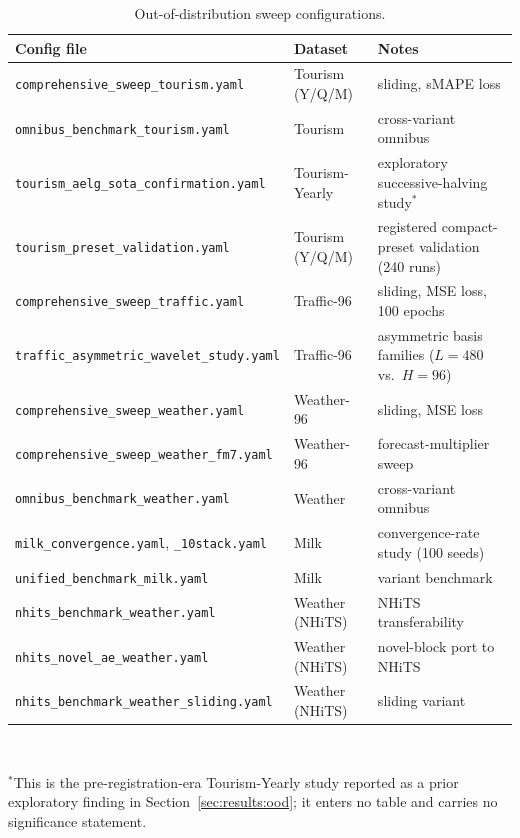 \begin{table}[h]
\centering
\small
\caption{Out-of-distribution sweep configurations.}
\label{tab:configs_ood}
\begin{tabular}{@{}lll@{}}
\toprule
Config file & Dataset & Notes \\
\midrule
\texttt{comprehensive\_sweep\_tourism.yaml} & Tourism (Y/Q/M) & sliding, sMAPE loss \\
\texttt{omnibus\_benchmark\_tourism.yaml} & Tourism & cross-variant omnibus \\
\texttt{tourism\_aelg\_sota\_confirmation.yaml} & Tourism-Yearly & exploratory successive-halving study$^{*}$ \\
\texttt{tourism\_preset\_validation.yaml} & Tourism (Y/Q/M) & registered compact-preset validation (240 runs) \\
\texttt{comprehensive\_sweep\_traffic.yaml} & Traffic-96 & sliding, MSE loss, 100 epochs \\
\texttt{traffic\_asymmetric\_wavelet\_study.yaml} & Traffic-96 & asymmetric basis families ($L=480$ vs.\ $H=96$) \\
\texttt{comprehensive\_sweep\_weather.yaml} & Weather-96 & sliding, MSE loss \\
\texttt{comprehensive\_sweep\_weather\_fm7.yaml} & Weather-96 & forecast-multiplier sweep \\
\texttt{omnibus\_benchmark\_weather.yaml} & Weather & cross-variant omnibus \\
\texttt{milk\_convergence.yaml}, \texttt{\_10stack.yaml} & Milk & convergence-rate study (100 seeds) \\
\texttt{unified\_benchmark\_milk.yaml} & Milk & variant benchmark \\
\texttt{nhits\_benchmark\_weather.yaml} & Weather (NHiTS) & NHiTS transferability \\
\texttt{nhits\_novel\_ae\_weather.yaml} & Weather (NHiTS) & novel-block port to NHiTS \\
\texttt{nhits\_benchmark\_weather\_sliding.yaml} & Weather (NHiTS) & sliding variant \\
\bottomrule
\end{tabular}\\[0.3em]
\begin{minipage}{0.92\linewidth}
\footnotesize
$^{*}$This is the pre-registration-era Tourism-Yearly study reported as a
prior exploratory finding in Section~\ref{sec:results:ood}; it enters no
table and carries no significance statement.
\end{minipage}
\end{table}


